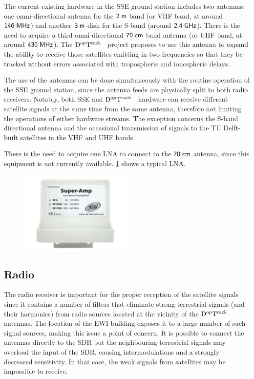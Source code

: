 \documentclass[11pt,a4paper,oneside]{article}
\newcommand{\GroundStationName}{${\rm D^{\rm op}T^{\rm rack}}$}
\newcommand{\halftextwidth}{0.5\textwidth}
\newcommand{\unit}[2]{$ {\sf #1}\thickspace{\sf #2}$}
\begin{document}
The current existing hardware in the \ac{SSE} ground station includes two antennas: one omni-directional antenna for the \unit{2}{m} band (or \ac{VHF} band, at around \unit{146}{MHz}) and another \unit{3}{m}-dish for the S-band (around \unit{2.4}{GHz}). There is the need to acquire a third omni-directional \unit{70}{cm} band antenna (or \ac{UHF} band, at around \unit{430}{MHz}). The \GroundStationName~ project proposes to use this antenna to expand the ability to receive those satellites emitting in two frequencies so that they be tracked without errors associated with tropospheric and ionospheric delays.

The use of the antennas can be done simultaneously with the routine operation of the \ac{SSE} ground station, since the antenna feeds are physically split to both radio receivers. Notably, both \ac{SSE} and \GroundStationName~ hardware can receive different satellite signals at the same time from the same antenna, therefore not limiting the operations of either hardware streams. The exception concerns the S-band directional antenna and the occasional transmission of signals to the TU Delft-built satellites in the \ac{VHF} and \ac{UHF} bands.

There is the need to acquire one \ac{LNA} to connect to the \unit{70}{cm} antenna, since this equipment is not currently available. \ref{fig:lna} shows a typical \ac{LNA}.

\begin{figure}[!ht]
\centering
\includegraphics[width=\halftextwidth]{LNA}
\caption{\modellna}
\label{fig:lna}
\end{figure}



\subsection{Radio}

The radio receiver is important for the proper reception of the satellite signals since it contains a number of filters that eliminate strong terrestrial signals (and their harmonics) from radio sources located at the vicinity of the \GroundStationName~ antennas. The location of the \ac{EWI} building exposes it to a large number of such signal sources, making this issue a point of concern. It is possible to connect the antennas directly to the \ac{SDR} but the neighbouring terrestrial signals may overload the input of the \ac{SDR}, causing intermodulations and a strongly decreased sensitivity. In that case, the weak signals from satellites may be impossible to receive.
\end{document}

